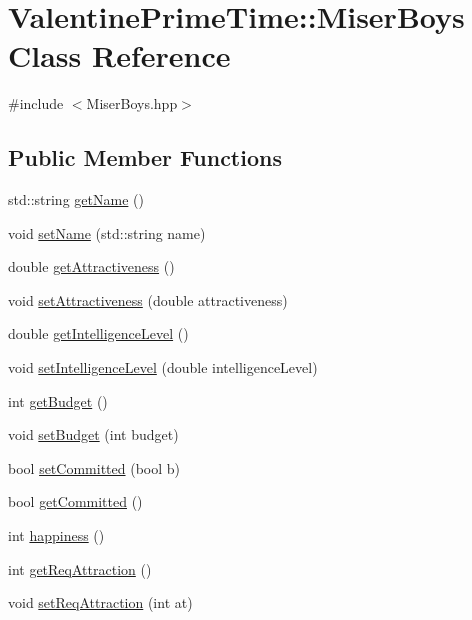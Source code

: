 \hypertarget{classValentinePrimeTime_1_1MiserBoys}{}\section{Valentine\+Prime\+Time\+:\+:Miser\+Boys Class Reference}
\label{classValentinePrimeTime_1_1MiserBoys}


{\ttfamily \#include $<$Miser\+Boys.\+hpp$>$}

\subsection*{Public Member Functions}
\begin{DoxyCompactItemize}
\item 
std\+::string \hyperlink{classValentinePrimeTime_1_1MiserBoys_ad83a113ba4fba7dcc408cb1088722a9c}{get\+Name} ()
\item 
void \hyperlink{classValentinePrimeTime_1_1MiserBoys_a42702169d086b7eab5a81ee363433839}{set\+Name} (std\+::string name)
\item 
double \hyperlink{classValentinePrimeTime_1_1MiserBoys_a8788c7e6b23e73b04fec437c9d5613ba}{get\+Attractiveness} ()
\item 
void \hyperlink{classValentinePrimeTime_1_1MiserBoys_a6448593fc9b11f6c346244f2597a824a}{set\+Attractiveness} (double attractiveness)
\item 
double \hyperlink{classValentinePrimeTime_1_1MiserBoys_a79aa44f49fb5202578244bc97840b82e}{get\+Intelligence\+Level} ()
\item 
void \hyperlink{classValentinePrimeTime_1_1MiserBoys_af2fc4ce7ee934816c24f3cbd6fe3333c}{set\+Intelligence\+Level} (double intelligence\+Level)
\item 
int \hyperlink{classValentinePrimeTime_1_1MiserBoys_aebf9e746402037e6406ce294bcf5ed32}{get\+Budget} ()
\item 
void \hyperlink{classValentinePrimeTime_1_1MiserBoys_a42f332f1ac26fdde07fd76f55707146b}{set\+Budget} (int budget)
\item 
bool \hyperlink{classValentinePrimeTime_1_1MiserBoys_ac59e45afde14e072af34ff1599dd49d0}{set\+Committed} (bool b)
\item 
bool \hyperlink{classValentinePrimeTime_1_1MiserBoys_a0a8d483e85b69e8b84c0fda725487129}{get\+Committed} ()
\item 
int \hyperlink{classValentinePrimeTime_1_1MiserBoys_aff00d50f4b26e8fa21d52c90f6d1d62a}{happiness} ()
\item 
int \hyperlink{classValentinePrimeTime_1_1MiserBoys_a8ba1208f672f64b8f652dd8a02c8750a}{get\+Req\+Attraction} ()
\item 
void \hyperlink{classValentinePrimeTime_1_1MiserBoys_a2245d744e748015e767b0755fbf19fe8}{set\+Req\+Attraction} (int at)
\end{DoxyCompactItemize}


